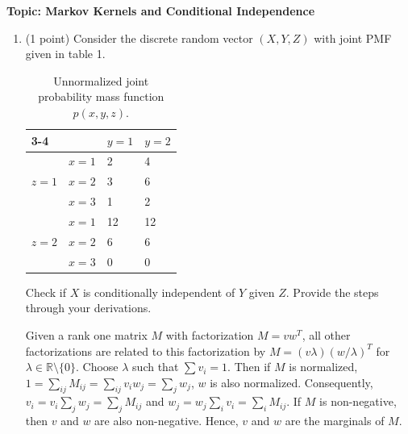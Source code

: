 

\flushleft\textbf{Topic: Markov Kernels and Conditional Independence}

\begin{enumerate}
\item (1 point) Consider the discrete random vector $(X, Y, Z)$ with joint PMF given in table 1.

\begin{table}[htb]
\centering
\begin{tabular}{llll}
\cline{3-4}
                                           & \multicolumn{1}{l|}{}    & \multicolumn{1}{l|}{$y=1$} & \multicolumn{1}{l|}{$y=2$} \\ \hline
\multicolumn{1}{|c|}{\multirow{3}{*}{$z=1$}} & \multicolumn{1}{l|}{$x=1$} & \multicolumn{1}{l|}{2}  & \multicolumn{1}{l|}{4}  \\ \cline{2-4} 
\multicolumn{1}{|c|}{}                     & \multicolumn{1}{l|}{$x=2$} & \multicolumn{1}{l|}{3}  & \multicolumn{1}{l|}{6}  \\ \cline{2-4} 
\multicolumn{1}{|c|}{}                     & \multicolumn{1}{l|}{$x=3$} & \multicolumn{1}{l|}{1}  & \multicolumn{1}{l|}{2}  \\ \hline
\multicolumn{1}{|l|}{\multirow{3}{*}{$z=2$}} & \multicolumn{1}{l|}{$x=1$} & \multicolumn{1}{l|}{12}  & \multicolumn{1}{l|}{12}  \\ \cline{2-4} 
\multicolumn{1}{|l|}{}                     & \multicolumn{1}{l|}{$x=2$} & \multicolumn{1}{l|}{6}  & \multicolumn{1}{l|}{6}    \\ \cline{2-4} 
\multicolumn{1}{|l|}{}                     & \multicolumn{1}{l|}{$x=3$} & \multicolumn{1}{l|}{0}    & \multicolumn{1}{l|}{0}  \\ \hline
\end{tabular}
\caption{Unnormalized joint probability mass function $p(x, y, z)$.}
\end{table}\label{discrete-ci}

Check if $X$ is conditionally independent of $Y$ given $Z$. Provide the steps through your derivations.
\begin{gradedsolution}
  Given a rank one matrix $M$ with factorization $M=vw^T$, all other factorizations are related to this factorization by $M=(v \lambda)(w / \lambda)^T$ for $\lambda \in \mathbb{R}\setminus\{0\}$. Choose $\lambda$ such that $\sum v_i=1$. Then if $M$ is normalized, $1=\sum_{ij}M_{ij}=\sum_{ij}v_iw_j=\sum_jw_j$, $w$ is also normalized. Consequently, $v_i=v_i \sum_j w_j = \sum_j M_{ij}$ and $w_j= w_j \sum_i v_i = \sum_i M_{ij} $. If $M$ is non-negative, then $v$ and $w$ are also non-negative. Hence, $v$ and $w$ are the marginals of $M$.


\end{gradedsolution}
\end{enumerate}
